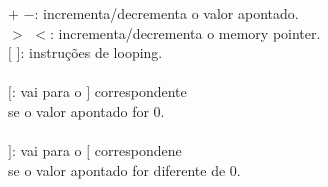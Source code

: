 \documentclass[preview]{standalone}
\begin{document}
$+$ $-$: incrementa/decrementa o valor apontado.\\$>$ $<$: incrementa/decrementa o memory pointer.\\$[$ $]$: instruções de looping.\\\\$[$: vai para o $]$ correspondente\\se o valor apontado for 0.\\\\$]$: vai para o $[$ correspondene\\se o valor apontado for diferente de 0.\\
\end{document}
